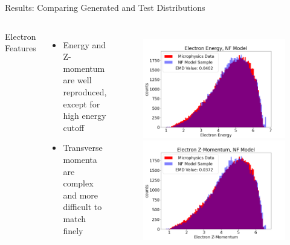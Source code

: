 \documentclass[aspectratio=169]{beamer}
\begin{document}
\begin{frame}{Results: Comparing Generated and Test Distributions}
   \begin{columns}
            Electron Features
            \begin{itemize}
                    \setlength\itemsep{0.3em}
                    \item Energy and Z-momentum are well reproduced, except for high energy cutoff
                    \item Transverse momenta are complex and more difficult to match finely
            \end{itemize}
   
            \begin{figure}[H]
            \centering
            \includegraphics[width=.97\textwidth]{images/Features16/Electron_Energy,_NF_Model.png}
            \includegraphics[width=.97\textwidth]{images/Features16/Electron_Z-Momentum,_NF_Model.png}
            \label{fig:clas6}
            \end{figure}
            

\end{columns}
\end{frame}
\end{document}
